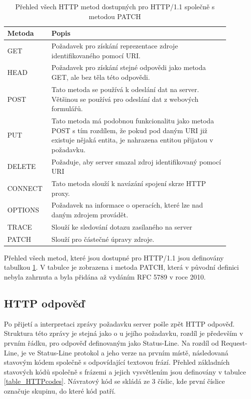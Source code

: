 \begin{table}[h]
\centering
\begin{tabular}{ |p{0.15\linewidth} | p{0.75\linewidth}| } 
 \hline
Metoda & Popis \\ 
 \hline
GET & Požadavek pro získání reprezentace zdroje identifikovaného pomocí URI. \\ 
\hline
HEAD & Požadavek pro získání stejné odpovědi jako metoda GET, ale bez těla této odpovědi. \\ 
\hline
POST & Tato metoda se používá k odeslání dat na server. Většinou se používá pro odeslání dat z webových formulářů. \\ 
\hline
PUT & Tato metoda má podobnou funkcionalitu jako metoda POST s tím rozdílem, že pokud pod daným URI již existuje nějaká entita, je nahrazena entitou přijatou v požadavku. \\ 
\hline
DELETE & Požaduje, aby server smazal zdroj identifikovaný pomocí URI \\
\hline
CONNECT & Tato metoda slouží k navázání spojení skrze HTTP proxy. \\
\hline
OPTIONS & Požadavek na informace o operacích, které lze nad daným zdrojem provádět. \\  
\hline
TRACE & Slouží ke sledování dotazu zasílaného na server \\
\hline
PATCH & Slouží pro částečné úpravy zdroje. \\ 
 \hline
\end{tabular}
\caption{Přehled všech HTTP metod dostupných pro HTTP/1.1 společně s metodou PATCH}
\label{table_HTTPmethods}
\end{table}

Přehled všech metod, které jsou dostupné pro HTTP/1.1 jsou definovány tabulkou \ref{table_HTTPmethods}. V tabulce je zobrazena i metoda PATCH, která v původní definici nebyla zahrnuta a byla přidána až vydáním RFC 5789 v roce 2010. 


\subsection*{HTTP odpověď}


Po přijetí a interpretaci zprávy požadavku server pošle zpět HTTP odpověď. Struktura této zprávy je stejná jako o u jejího požadavku, rozdíl je především v prvním řádku, pro odpověď definovaným jako Status-Line. Na rozdíl od Request-Line, je ve Status-Line protokol a jeho verze na prvním místě, následovaná stavovým kódem společně s odpovídající textovou frází. Přehled základních stavových kódů společně s frázemi a jejich vysvětlením jsou definovány v tabulce \ref{table_HTTPcodes}. Návratový kód se skládá ze 3 číslic, kde první číslice označuje skupinu, do které kód patří.

